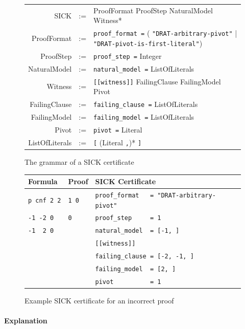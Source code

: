\documentclass[
]{report}
\begin{document}
\begin{figure}
    \begin{tabular}{rcl}
    SICK            & := & ProofFormat ProofStep NaturalModel Witness* \\
    ProofFormat     & := & \texttt{proof\_format =}
    ( \texttt{"DRAT-arbitrary-pivot"} | \texttt{"DRAT-pivot-is-first-literal"}) \\
    ProofStep       & := & \texttt{proof\_step =} Integer \\
    NaturalModel    & := & \texttt{natural\_model =} ListOfLiterals \\
    Witness         & := & \texttt{[[witness]]} FailingClause FailingModel Pivot \\
    FailingClause   & := & \texttt{failing\_clause =} ListOfLiterals \\
    FailingModel    & := & \texttt{failing\_model =} ListOfLiterals \\
    Pivot           & := & \texttt{pivot =} Literal \\
    ListOfLiterals  & := & \texttt{[} (Literal \texttt{,})* \texttt{]} \\
    \end{tabular}
    \caption{The grammar of a SICK certificate\label{grammar}}
\end{figure}

\begin{figure}
    \begin{longtable}[]{@{}l|l|l@{}}
        Formula & Proof & SICK Certificate\tabularnewline
        \midrule
        \endhead
        \texttt{p\ cnf\ 2\ 2} & \texttt{1\ 0} &
        \texttt{proof\_format\ \ \ =\ "DRAT-arbitrary-pivot"}\tabularnewline
        \texttt{-1\ -2\ 0} & \texttt{0} &
        \texttt{proof\_step\ \ \ \ \ =\ 1}\tabularnewline
        \texttt{-1\ \ 2\ 0} & &
        \texttt{natural\_model\ \ =\ {[}-1,\ {]}}\tabularnewline
        & & \texttt{{[}{[}witness{]}{]}}\tabularnewline
        & & \texttt{failing\_clause\ =\ {[}-2,\ -1,\ {]}}\tabularnewline
        & & \texttt{failing\_model\ \ =\ {[}2,\ {]}}\tabularnewline
        & & \texttt{pivot\ \ \ \ \ \ \ \ \ \ =\ 1}\tabularnewline
    \end{longtable}
    \caption{Example SICK certificate for an incorrect proof\label{sick-example}}
\end{figure}

\paragraph{Explanation}
\end{document}
